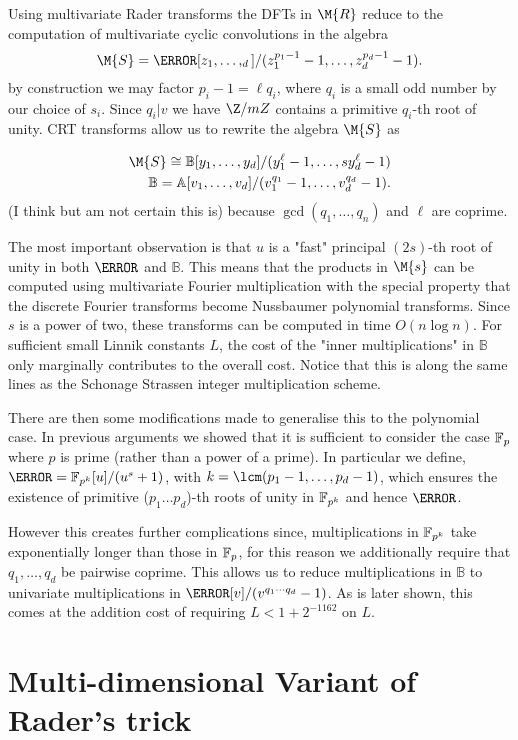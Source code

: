 Using multivariate Rader transforms the DFTs in $\M{R}$ reduce to the computation of multivariate cyclic convolutions in the algebra
\[
    \M{S} = \A[z_1, \ldots, _d] / (z_1^{p_1 - 1} - 1, \ldots, z_d^{p_d - 1} - 1).
\]
by construction we may factor $p_i - 1 = \ell q_i$, where $q_i$ is a small odd number by our choice of $s_i$. Since $q_i | v$ we have $\Z /mZ$ contains a primitive $q_i$-th root of unity. CRT transforms allow us to rewrite the algebra $\M{S}$ as

\begin{align*}
    \M{S} \cong \mathbb{B}[y_1, \ldots, y_d]/(y_1^\ell - 1, \ldots,s y_d^\ell - 1)\\
    \mathbb{B} = \mathbb{A}[v_1, \ldots, v_d] / (v_1^{q_1} - 1, \ldots, v_d^{q_d} - 1).
\end{align*}
(I think but am not certain this is) because $\gcd(q_1, \ldots, q_n)$ and $\ell$ are coprime.

The most important observation is that $u$ is a "fast" principal $(2s)$-th root of unity in both $\A$ and $\mathbb{B}$. This means that the products in $\M{s}$ can be computed using multivariate Fourier multiplication with the special property that the discrete Fourier transforms become Nussbaumer polynomial transforms. Since $s$ is a power of two, these transforms can be computed in time $O(n \log n)$. For sufficient small Linnik constants $L$, the cost of the "inner multiplications" in $\mathbb{B}$ only marginally contributes to the overall cost. Notice that this is along the same lines as the Schonage Strassen integer multiplication scheme.

There are then some modifications made to generalise this to the polynomial case. In previous arguments we showed that it is sufficient to consider the case $\mathbb{F}_p$ where $p$ is prime (rather than a power of a prime). In particular we define, $\A = \F_{p^k}[u] / (u^s + 1)$, with $k = \lcm(p_1 - 1, \ldots, p_d - 1)$, which ensures the existence of primitive ($p_1 \ldots p_d$)-th roots of unity in $\mathbb{F}_{p^k}$ and hence $\A$.

However this creates further complications since, multiplications in $\mathbb{F}_{p^k}$ take exponentially longer than those in $\mathbb{F}_p$, for this reason we additionally require that $q_1, \ldots, q_d$ be pairwise coprime. This allows us to reduce multiplications in $\mathbb{B}$ to univariate multiplications in $\A[v]/(v^{q_1\cdots q_d} - 1)$. As is later shown, this comes at the addition cost of requiring $L < 1 + 2^{-1162}$ on $L$.

\section{Multi-dimensional Variant of Rader's trick}%
\label{sec:multi_dimensional_variant_of_rader_s_trick}

